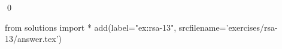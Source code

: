 
\begin{ex} 
  \label{ex:rsa-13}
  
  \qed
\end{ex} 
\begin{python0}
from solutions import *
add(label="ex:rsa-13",
    srcfilename='exercises/rsa-13/answer.tex') 
\end{python0}
